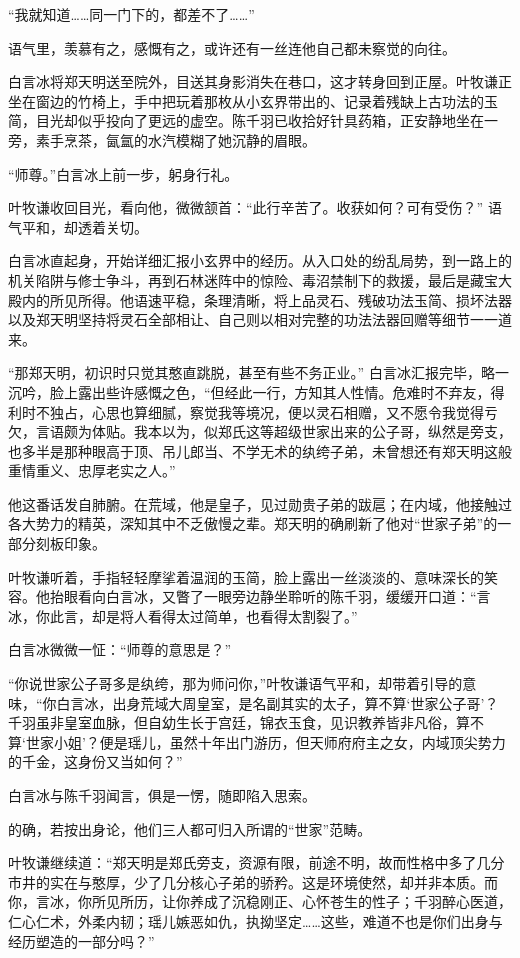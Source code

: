 “我就知道……同一门下的，都差不了……”

语气里，羡慕有之，感慨有之，或许还有一丝连他自己都未察觉的向往。

\vspace{2em}

白言冰将郑天明送至院外，目送其身影消失在巷口，这才转身回到正屋。叶牧谦正坐在窗边的竹椅上，手中把玩着那枚从小玄界带出的、记录着残缺上古功法的玉简，目光却似乎投向了更远的虚空。陈千羽已收拾好针具药箱，正安静地坐在一旁，素手烹茶，氤氲的水汽模糊了她沉静的眉眼。

“师尊。”白言冰上前一步，躬身行礼。

叶牧谦收回目光，看向他，微微颔首：“此行辛苦了。收获如何？可有受伤？” 语气平和，却透着关切。

白言冰直起身，开始详细汇报小玄界中的经历。从入口处的纷乱局势，到一路上的机关陷阱与修士争斗，再到石林迷阵中的惊险、毒沼禁制下的救援，最后是藏宝大殿内的所见所得。他语速平稳，条理清晰，将上品灵石、残破功法玉简、损坏法器以及郑天明坚持将灵石全部相让、自己则以相对完整的功法法器回赠等细节一一道来。

“那郑天明，初识时只觉其憨直跳脱，甚至有些不务正业。” 白言冰汇报完毕，略一沉吟，脸上露出些许感慨之色，“但经此一行，方知其人性情。危难时不弃友，得利时不独占，心思也算细腻，察觉我等境况，便以灵石相赠，又不愿令我觉得亏欠，言语颇为体贴。我本以为，似郑氏这等超级世家出来的公子哥，纵然是旁支，也多半是那种眼高于顶、吊儿郎当、不学无术的纨绔子弟，未曾想还有郑天明这般重情重义、忠厚老实之人。”

他这番话发自肺腑。在荒域，他是皇子，见过勋贵子弟的跋扈；在内域，他接触过各大势力的精英，深知其中不乏傲慢之辈。郑天明的确刷新了他对“世家子弟”的一部分刻板印象。

叶牧谦听着，手指轻轻摩挲着温润的玉简，脸上露出一丝淡淡的、意味深长的笑容。他抬眼看向白言冰，又瞥了一眼旁边静坐聆听的陈千羽，缓缓开口道：“言冰，你此言，却是将人看得太过简单，也看得太割裂了。”

白言冰微微一怔：“师尊的意思是？”

“你说世家公子哥多是纨绔，那为师问你，”叶牧谦语气平和，却带着引导的意味，“你白言冰，出身荒域大周皇室，是名副其实的太子，算不算‘世家公子哥’？千羽虽非皇室血脉，但自幼生长于宫廷，锦衣玉食，见识教养皆非凡俗，算不算‘世家小姐’？便是瑶儿，虽然十年出门游历，但天师府府主之女，内域顶尖势力的千金，这身份又当如何？”

白言冰与陈千羽闻言，俱是一愣，随即陷入思索。

的确，若按出身论，他们三人都可归入所谓的“世家”范畴。

叶牧谦继续道：“郑天明是郑氏旁支，资源有限，前途不明，故而性格中多了几分市井的实在与憨厚，少了几分核心子弟的骄矜。这是环境使然，却并非本质。而你，言冰，你所见所历，让你养成了沉稳刚正、心怀苍生的性子；千羽醉心医道，仁心仁术，外柔内韧；瑶儿嫉恶如仇，执拗坚定……这些，难道不也是你们出身与经历塑造的一部分吗？”

